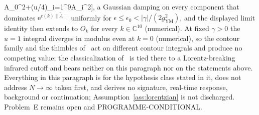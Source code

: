 A_0^2+\sin(\pi u/4)\sum_{i=1}^{9}\tilde A_i^2]\), a Gaussian damping on every component that dominates \(\mathrm e^{c(k)\|\tilde A\|}\) uniformly for \(\epsilon\le\epsilon_0<|\gamma|/(2g_{\mathrm{YM}}^2)\), and the displayed limit identity then extends to \(O_k\) for every \(k\in\mathbb C^{10}\) (numerical). At fixed \(\gamma>0\) the \(u=1\) integral diverges in modulus even at \(k=0\) (numerical), so the contour family and the thimbles of~\cite{ChouNishimuraTripathi2025} act on different contour integrals and produce no competing value; the classicalization of~\cite{AsanoNishimuraPiensukYamamori2025} is tied there to a Lorentz-breaking infrared cutoff and bears neither on this paragraph nor on the statements above. Everything in this paragraph is for the hypothesis class stated in it, does not address \(N\to\infty\) taken first, and derives no signature, real-time response, background or continuation; Assumption~\ref{ass:lorentzian} is not discharged. Problem~E remains open and PROGRAMME-CONDITIONAL.
